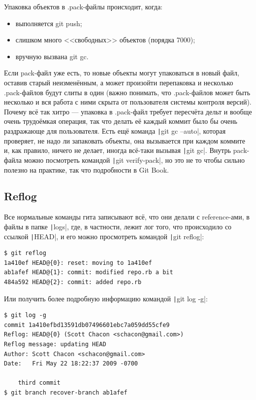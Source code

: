 \documentclass{../text-style}
\begin{document}
Упаковка объектов в .pack-файлы происходит, когда:
\begin{itemize}
    \item выполняется git push;
    \item слишком много <<свободных>> объектов (порядка 7000);
    \item вручную вызвана git gc.
\end{itemize}

Если pack-файл уже есть, то новые объекты могут упаковаться в новый файл, оставив старый неизменённым, а может произойти перепаковка и несколько .pack-файлов будут слиты в один (важно понимать, что .pack-файлов может быть несколько и вся работа с ними скрыта от пользователя системы контроля версий). Почему всё так хитро --- упаковка в .pack-файл требует пересчёта дельт и вообще очень трудоёмкая операция, так что делать её каждый коммит было бы очень раздражающе для пользователя. Есть ещё команда \texttt|git gc --auto|, которая проверяет, не надо ли запаковать объекты, она вызывается при каждом коммите и, как правило, ничего не делает, иногда всё-таки вызывая \texttt|git gc|. Внутрь pack-файла можно посмотреть командой \texttt|git verify-pack|, но это не то чтобы сильно полезно на практике, так что подробности в Git Book.

\subsection{Reflog}

Все нормальные команды гита записывают всё, что они делали с reference-ами, в файлы в папке \texttt|logs|, где, в частности, лежит лог того, что происходило со ссылкой \texttt|HEAD|, и его можно просмотреть командой \texttt|git reflog|:

\begin{verbatim}
$ git reflog
1a410ef HEAD@{0}: reset: moving to 1a410ef
ab1afef HEAD@{1}: commit: modified repo.rb a bit
484a592 HEAD@{2}: commit: added repo.rb
\end{verbatim}

Или получить более подробную информацию командой \texttt|git log -g|:

\begin{verbatim}
$ git log -g
commit 1a410efbd13591db07496601ebc7a059dd55cfe9
Reflog: HEAD@{0} (Scott Chacon <schacon@gmail.com>)
Reflog message: updating HEAD
Author: Scott Chacon <schacon@gmail.com>
Date:   Fri May 22 18:22:37 2009 -0700

    third commit
$ git branch recover-branch ab1afef
\end{verbatim}
\end{document}
